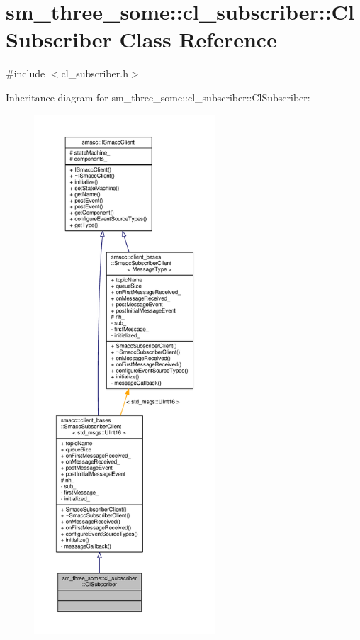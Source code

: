 \hypertarget{classsm__three__some_1_1cl__subscriber_1_1ClSubscriber}{}\section{sm\+\_\+three\+\_\+some\+:\+:cl\+\_\+subscriber\+:\+:Cl\+Subscriber Class Reference}
\label{classsm__three__some_1_1cl__subscriber_1_1ClSubscriber}


{\ttfamily \#include $<$cl\+\_\+subscriber.\+h$>$}



Inheritance diagram for sm\+\_\+three\+\_\+some\+:\+:cl\+\_\+subscriber\+:\+:Cl\+Subscriber\+:\nopagebreak
\begin{figure}[H]
\begin{center}
\leavevmode
\includegraphics[height=550pt]{classsm__three__some_1_1cl__subscriber_1_1ClSubscriber__inherit__graph}
\end{center}
\end{figure}


